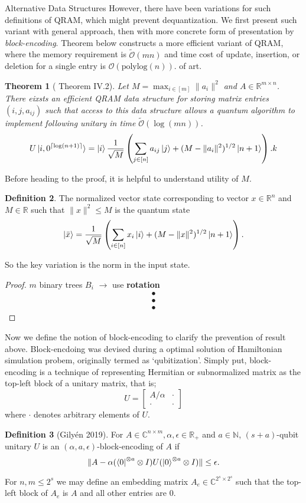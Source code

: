\documentclass[10pt,twoside,reqno]{amsart} %
\makeatletter
\renewcommand{\section}{\@startsection{section}{1}
   \z@{.7\linespacing\@plus\linespacing}{.5\linespacing}
   {\normalfont\upshape\bfseries\centering}}
\theoremstyle{plain}
\newtheorem{thm}{Theorem}[section]
\theoremstyle{definition}
\newtheorem{defn}[thm]{Definition}
\makeatother
\begin{document}
\section{Alternative Data Structures}
However, there have been variations for such definitions of QRAM, which might
prevent dequantization. We first present such variant with general approach,
then with more concrete form of presentation by \emph{block-encoding}.
Theorem below constructs a more efficient variant of QRAM, where the memory
requirement \cite{kerenidis2020} is $\widetilde{\mathcal{O}}(mn)$ and time cost
of update, insertion, or deletion for a single entry is
$\mathcal{O}(\textrm{polylog}(n))$.
of art. 
\begin{thm}[\cite{kerenidis2020} Theorem IV.2]
  Let $M=\max_{i\in[m]}\|a_i\|^2$ and $A\in\mathbb{R}^{m\times n}$. There
  eixsts an efficient QRAM data structure for storing matrix entries
  $(i,j,a_{ij})$ such that access to this data structure allows a quantum
  algorithm to implement following unitary in time 
  $\widetilde{\mathcal{O}}(\log (mn))$.
  \[
    U\ket{i,0^{\lceil\log(n+1)\rceil}} = \ket{i}\frac{1}{\sqrt{M}}
    \left(\sum_{j\in[n]}a_{ij}\ket{j}+(M-\|a_i\|^2)^{1/2}\ket{n+1}\right).k
  \]
\end{thm}
Before heading to the proof, it is helpful to understand utility of $M$.
\begin{defn}
  The normalized vector state corresponding to vector $x\in\mathbb{R}^n$ and
  $M\in\mathbb{R}$ such that $\|x\|^2\leq M$ is the quantum state
  \[
    \ket{\bar{x}} = \frac{1}{\sqrt{M}}
    \left(\sum_{i\in[n]}x_i\ket{i}+(M-\|x\|^2)^{1/2}\ket{n+1}\right).
  \]
\end{defn}
So the key variation is the norm in the input state.
\begin{proof}
  $m$ binary trees $B_i$ $\longrightarrow$ use {\bfseries rotation}
  \begin{align*}
    \bullet\\\bullet \\\bullet
  \end{align*}
\end{proof}
Now we define the notion of block-encoding to clarify the prevention
of result above. Block-encdoing was devised during a optimal
solution of Hamiltonian simulation probem, \cite{low2019} originally termed
as `qubitization'. Simply put, block-encoding is a technique of representing
Hermitian or subnormalized matrix as the top-left block of a unitary matrix, 
that is;
\[
  U=\begin{bmatrix}A/\alpha &\cdot \\ \cdot &\cdot \end{bmatrix}
\]
where $\cdot$ denotes arbitrary elements of $U$. 
\begin{defn}[Gily\'en 2019] For $A\in\mathbb{C}^{n\times m}, \alpha,\epsilon
  \in\mathbb{R}_{+}$ and $a\in\mathbb{N}$, $(s+a)$-qubit unitary $U$ is an
  $(\alpha,a,\epsilon)$-block-encoding of $A$ if
  \[
    \|A-\alpha(\bra0^{\otimes a}\otimes I)U(\ket0^{\otimes a}\otimes I)\|\leq
    \epsilon.
  \]
\end{defn}
For $n,m\leq 2^s$ we may define an embedding matrix $A_e\in
\mathbb{C}^{2^s\times 2^s}$ such that the top-left block of $A_e$ is $A$ and
all other entries are $0$.
\end{document}
